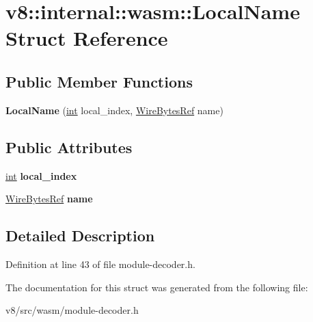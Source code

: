 \hypertarget{structv8_1_1internal_1_1wasm_1_1LocalName}{}\section{v8\+:\+:internal\+:\+:wasm\+:\+:Local\+Name Struct Reference}
\label{structv8_1_1internal_1_1wasm_1_1LocalName}
\subsection*{Public Member Functions}
\begin{DoxyCompactItemize}
\item 
\mbox{\label{structv8_1_1internal_1_1wasm_1_1LocalName_a0bf4c4539dd00d2a30cd66fc15273e50}} 
{\bfseries Local\+Name} (\mbox{\hyperlink{classint}{int}} local\+\_\+index, \mbox{\hyperlink{classv8_1_1internal_1_1wasm_1_1WireBytesRef}{Wire\+Bytes\+Ref}} name)
\end{DoxyCompactItemize}
\subsection*{Public Attributes}
\begin{DoxyCompactItemize}
\item 
\mbox{\label{structv8_1_1internal_1_1wasm_1_1LocalName_a8e23ad0a936ec8a65e24e27bc62c543c}} 
\mbox{\hyperlink{classint}{int}} {\bfseries local\+\_\+index}
\item 
\mbox{\label{structv8_1_1internal_1_1wasm_1_1LocalName_a8db1ccb8f9ff647ea7d821976880d41b}} 
\mbox{\hyperlink{classv8_1_1internal_1_1wasm_1_1WireBytesRef}{Wire\+Bytes\+Ref}} {\bfseries name}
\end{DoxyCompactItemize}


\subsection{Detailed Description}


Definition at line 43 of file module-\/decoder.\+h.



The documentation for this struct was generated from the following file\+:\begin{DoxyCompactItemize}
\item 
v8/src/wasm/module-\/decoder.\+h\end{DoxyCompactItemize}
